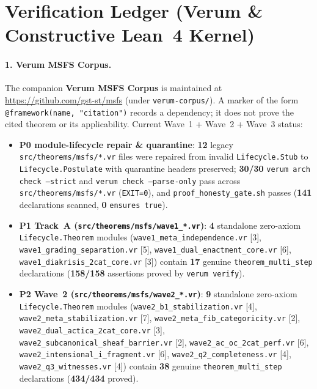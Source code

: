 \documentclass[11pt]{article}
\theoremstyle{plain}
\theoremstyle{definition}
\begin{document}
\section{Verification Ledger (Verum \& Constructive Lean~4 Kernel)}\label{app:verification-ledger}

\paragraph{1. Verum MSFS Corpus.}
The companion \textbf{Verum MSFS Corpus} is maintained at \mbox{\url{https://github.com/gst-st/msfs}} (under \texttt{verum-corpus/}). A marker of the form \texttt{@framework(name, "citation")} records a dependency; it does not prove the cited theorem or its applicability. Current Wave~1 + Wave~2 + Wave~3 status:
\begin{itemize}[nosep]
\item \textbf{P0 module-lifecycle repair \& quarantine}: \textbf{12} legacy \texttt{src/\allowbreak theorems/\allowbreak msfs/*.vr} files were repaired from invalid \texttt{Lifecycle.\allowbreak Stub} to \texttt{Lifecycle.\allowbreak Postulate} with quarantine headers preserved; \textbf{30/30} \texttt{verum arch check --strict} and \texttt{verum check --parse-only} pass across \texttt{src/theorems/msfs/*.vr} (\texttt{EXIT=0}), and \texttt{proof\_honesty\_gate.sh} passes (\textbf{141} declarations scanned, \textbf{0} \texttt{ensures true}).
\item \textbf{P1 Track~A (\texttt{src/\allowbreak theorems/\allowbreak msfs/\allowbreak wave1\_*.vr})}: \textbf{4} standalone zero-axiom \texttt{Lifecycle.\allowbreak Theorem} modules (\texttt{wave1\_\allowbreak meta\_\allowbreak independence.vr} [3], \texttt{wave1\_\allowbreak grading\_\allowbreak separation.vr} [5], \texttt{wave1\_\allowbreak dual\_\allowbreak enactment\_\allowbreak core.vr} [6], \texttt{wave1\_\allowbreak diakrisis\_\allowbreak 2cat\_\allowbreak core.vr} [3]) contain \textbf{17} genuine \texttt{theorem\_multi\_step} declarations (\textbf{158/158} assertions proved by \texttt{verum verify}).
\item \textbf{P2 Wave~2 (\texttt{src/\allowbreak theorems/\allowbreak msfs/\allowbreak wave2\_*.vr})}: \textbf{9} standalone zero-axiom \texttt{Lifecycle.\allowbreak Theorem} modules (\texttt{wave2\_\allowbreak b1\_\allowbreak stabilization.vr} [4], \texttt{wave2\_\allowbreak meta\_\allowbreak stabilization.vr} [7], \texttt{wave2\_\allowbreak meta\_\allowbreak fib\_\allowbreak categoricity.vr} [2], \texttt{wave2\_\allowbreak dual\_\allowbreak actica\_\allowbreak 2cat\_\allowbreak core.vr} [3], \texttt{wave2\_\allowbreak subcanonical\_\allowbreak sheaf\_\allowbreak barrier.vr} [2], \texttt{wave2\_\allowbreak ac\_\allowbreak oc\_\allowbreak 2cat\_\allowbreak perf.vr} [6], \texttt{wave2\_\allowbreak intensional\_\allowbreak i\_\allowbreak fragment.vr} [6], \texttt{wave2\_\allowbreak q2\_\allowbreak completeness.vr} [4], \texttt{wave2\_\allowbreak q3\_\allowbreak witnesses.vr} [4]) contain \textbf{38} genuine \texttt{theorem\_multi\_step} declarations (\textbf{434/434} proved).

\end{itemize}
\end{document}
